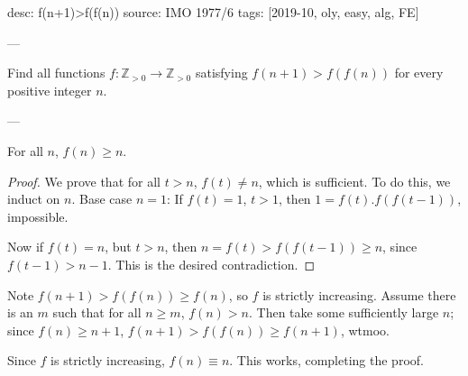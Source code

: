 desc: f(n+1)>f(f(n))
source: IMO 1977/6
tags: [2019-10, oly, easy, alg, FE]

---

Find all functions $f:\mathbb Z_{>0}\to\mathbb Z_{>0}$ satisfying $f(n+1)>f(f(n))$ for every positive integer $n$.

---

\begin{claim*}
    For all $n$, $f(n)\ge n$.
\end{claim*}
\begin{proof}
    We prove that for all $t>n$, $f(t)\ne n$, which is sufficient. To do this, we induct on $n$. Base case $n=1$: If $f(t)=1$, $t>1$, then $1=f(t).f(f(t-1))$, impossible.

    Now if $f(t)=n$, but $t>n$, then $n=f(t)>f(f(t-1))\ge n$, since $f(t-1)>n-1$. This is the desired contradiction.
\end{proof}

Note $f(n+1)>f(f(n))\ge f(n)$, so $f$ is strictly increasing. Assume there is an $m$ such that for all $n\ge m$, $f(n)>n$. Then take some sufficiently large $n$; since $f(n)\ge n+1$, $f(n+1)>f(f(n))\ge f(n+1)$, wtmoo.

Since $f$ is strictly increasing, $f(n)\equiv n$. This works, completing the proof.
